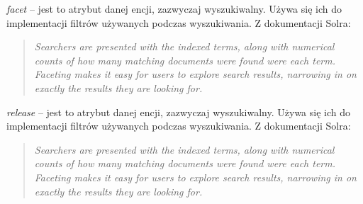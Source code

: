 \noindent
\textit{facet} -- jest to atrybut danej encji, zazwyczaj wyszukiwalny. Używa się ich do implementacji filtrów używanych podczas wyszukiwania. Z dokumentacji Solra:
\begin{quote} \textit{
	Searchers are presented with the indexed terms, along with numerical counts of how many matching documents were found were each term. Faceting makes it easy for users to explore search results, narrowing in on exactly the results they are looking for.
	}\cite{Solr}
\end{quote}


\noindent
\textit{release} -- jest to atrybut danej encji, zazwyczaj wyszukiwalny. Używa się ich do implementacji filtrów używanych podczas wyszukiwania. Z dokumentacji Solra:
\begin{quote} \textit{
		Searchers are presented with the indexed terms, along with numerical counts of how many matching documents were found were each term. Faceting makes it easy for users to explore search results, narrowing in on exactly the results they are looking for.
	}\cite{Solr}
\end{quote}


